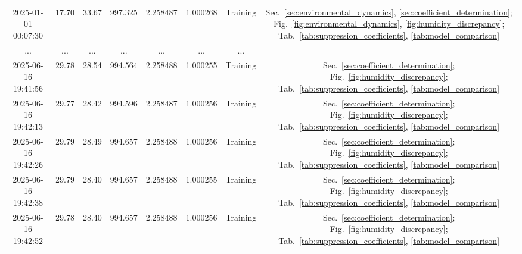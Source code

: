 \documentclass[aps,pra,reprint,groupedaddress,twocolumn,superscriptaddress]{revtex4-2}
\begin{document}
\begin{table}
\begin{ruledtabular}
\begin{tabular}{cccccccc}
2025-01-01 00:07:30 & 17.70 & 33.67 & 997.325 & 2.258487 & 1.000268 & Training& Sec.~\ref{sec:environmental_dynamics}, \ref{sec:coefficient_determination}; Fig.~\ref{fig:environmental_dynamics}, \ref{fig:humidity_discrepancy}; Tab.~\ref{tab:suppression_coefficients}, \ref{tab:model_comparison} \\
... & ... & ... & ... & ... & ... & ... \\
2025-06-16 19:41:56 & 29.78 & 28.54 & 994.564 & 2.258488 & 1.000255 & Training & Sec.~\ref{sec:coefficient_determination}; Fig.~\ref{fig:humidity_discrepancy}; Tab.~\ref{tab:suppression_coefficients}, \ref{tab:model_comparison} \\
2025-06-16 19:42:13 & 29.77 & 28.42 & 994.596 & 2.258487 & 1.000256 & Training & Sec.~\ref{sec:coefficient_determination}; Fig.~\ref{fig:humidity_discrepancy}; Tab.~\ref{tab:suppression_coefficients}, \ref{tab:model_comparison} \\
2025-06-16 19:42:26 & 29.79 & 28.49 & 994.657 & 2.258488 & 1.000256 & Training & Sec.~\ref{sec:coefficient_determination}; Fig.~\ref{fig:humidity_discrepancy}; Tab.~\ref{tab:suppression_coefficients}, \ref{tab:model_comparison} \\
2025-06-16 19:42:38 & 29.79 & 28.40 & 994.657 & 2.258488 & 1.000255 & Training & Sec.~\ref{sec:coefficient_determination}; Fig.~\ref{fig:humidity_discrepancy}; Tab.~\ref{tab:suppression_coefficients}, \ref{tab:model_comparison} \\
2025-06-16 19:42:52 & 29.78 & 28.40 & 994.657 & 2.258488 & 1.000256 & Training & Sec.~\ref{sec:coefficient_determination}; Fig.~\ref{fig:humidity_discrepancy}; Tab.~\ref{tab:suppression_coefficients}, \ref{tab:model_comparison} \\

\end{tabular}
\end{ruledtabular}
\end{table}
\end{document}
